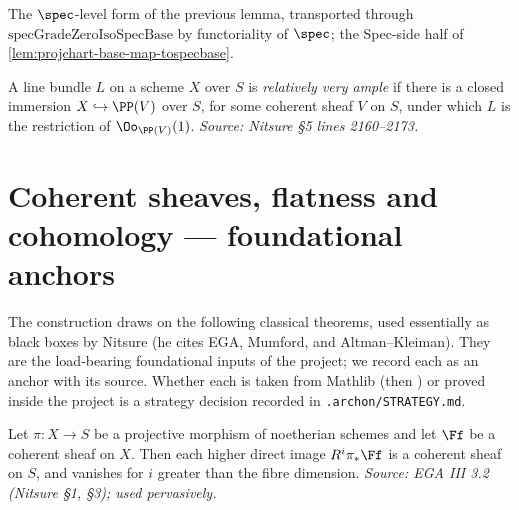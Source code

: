\begin{lemma}

  \label{lem:specmap-graded-zero-ringhom-projchart-base-hom}
  The $\spec$-level form of the previous lemma, transported through
  $\mathrm{specGradeZeroIsoSpecBase}$ by functoriality of $\spec$; the Spec-side
  half of \cref{lem:projchart-base-map-tospecbase}.
\end{lemma}

\begin{definition}
  \label{def:very-ample}
  A line bundle $L$ on a scheme $X$ over $S$ is \emph{relatively very ample} if
  there is a closed immersion $X\hookrightarrow \PP(V)$ over $S$, for some
  coherent sheaf $V$ on $S$, under which $L$ is the restriction of
  $\Oo_{\PP(V)}(1)$.
  \textit{Source: Nitsure §5 lines 2160--2173.}
\end{definition}

\section{Coherent sheaves, flatness and cohomology — foundational anchors}

The construction draws on the following classical theorems, used essentially as
black boxes by Nitsure (he cites EGA, Mumford, and Altman--Kleiman). They are the
load-bearing foundational inputs of the project; we record each as an anchor with
its source. Whether each is taken from Mathlib (then \mathlibok) or proved inside
the project is a strategy decision recorded in \texttt{.archon/STRATEGY.md}.

\begin{theorem}
  \label{thm:coherent-higher-direct-image}
  Let $\pi\colon X\to S$ be a projective morphism of noetherian schemes and let
  $\Ff$ be a coherent sheaf on $X$. Then each higher direct image
  $R^i\pi_*\Ff$ is a coherent sheaf on $S$, and vanishes for $i$ greater than
  the fibre dimension.
  \textit{Source: EGA III 3.2 (Nitsure §1, §3); used pervasively.}
\end{theorem}

